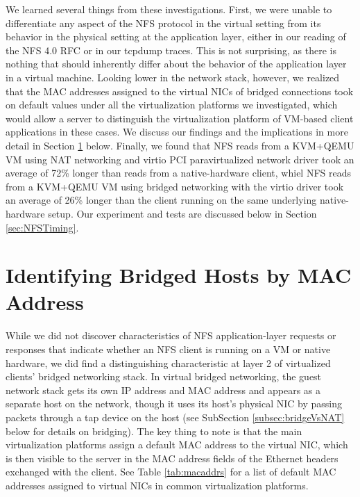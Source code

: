 \documentclass[11pt,pdftex,twocolumn]{article}
\begin{document}
We learned several things from these investigations. First, we were unable to differentiate any aspect of the NFS protocol in the virtual setting from its behavior in the physical setting at the application layer, either in our reading of the NFS 4.0 RFC or in our tcpdump traces. This is not surprising, as there is nothing that should inherently differ about the behavior of the application layer in a virtual machine. Looking lower in the network stack, however, we realized that the MAC addresses assigned to the virtual NICs of bridged connections took on default values under all the virtualization platforms we investigated, which would allow a server to distinguish the virtualization platform of VM-based client applications in these cases. We discuss our findings and the implications in more detail in Section \ref{sec:macaddrs} below. Finally, we found that NFS reads from a KVM+QEMU VM using NAT networking and virtio PCI paravirtualized network driver took an average of 72\% longer than reads from a native-hardware client, whiel NFS reads from a KVM+QEMU VM using bridged networking with the virtio driver took an average of 26\% longer than the client running on the same underlying native-hardware setup. Our experiment and tests are discussed below in Section \ref{sec:NFSTiming}. 

\section{Identifying Bridged Hosts by MAC Address}
\label{sec:macaddrs}
While we did not discover characteristics of NFS application-layer requests or responses that indicate whether an NFS client is running on a VM or native hardware, we did find a distinguishing characteristic at layer 2 of virtualized clients' bridged networking stack. In virtual bridged networking, the guest network stack gets its own IP address and MAC address and appears as a separate host on the network, though it uses its host's physical NIC by passing packets through a tap device on the host (see SubSection \ref{subsec:bridgeVsNAT} below for details on bridging). The key thing to note is that the main virtualization platforms assign a default MAC address to the virtual NIC, which is then visible to the server in the MAC address fields of the Ethernet headers exchanged with the client. See Table \ref{tab:macaddrs} for a list of default MAC addresses assigned to virtual NICs in common virtualization platforms. 
\end{document}
